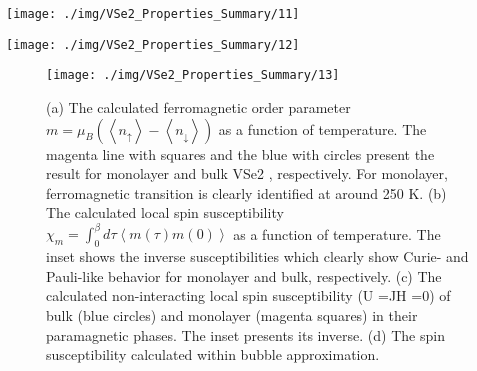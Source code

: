 \documentclass[reprint, aps, prb, showkeys]{revtex4-2}
\begin{document}
\begin{figure*}
    \texttt{[image: ./img/VSe2\_Properties\_Summary/11]}
    \caption{\label{fig:acs.jpcc.9b04281_STM} 
    Low-temperature STM images of CDW order in monolayer VSe2. On the MoS2 substrate the CDW is superimposed on the moiré structures (a, b). Different rotational domains are observed (c), and the unit cell can be identified as a √3R30 × √7R19.1 superstructure with respect to the VSe2 unit cell. The same structure can be described by two mirrored unit cells as illustrated in (e). An alternative unit cell is that described by the unit-cell diagonals of the two mirrored primitive unit cells as illustrated in (g). Often antiphase domain boundaries are observed in the CDW structure as shown in (f), giving rise to only small domains.
    }
\end{figure*}

\begin{figure*}
    \texttt{[image: ./img/VSe2\_Properties\_Summary/12]}
    \caption{\label{fig:acs.jpcc.9b04281_Phono} 
    Calculated phonon band structure of 1T monolayer structure of VSe2 (a) using spin-restricted DFT and (b) using spinpolarized DFT. The phonon soft modes with imaginary frequencies are highlighted by red color.
    }
\end{figure*}

\begin{figure}
    \texttt{[image: ./img/VSe2\_Properties\_Summary/13]}
    \caption{\label{fig:Kim_2020_OrderParameter} 
    (a) The calculated ferromagnetic order parameter $m = \mu_B(\left\langle n_{\uparrow} \right\rangle - \left\langle n_{\downarrow} \right\rangle)$ as a function of temperature. The magenta line with squares and the blue with circles present the result for monolayer and bulk VSe2 , respectively. For monolayer, ferromagnetic transition is clearly identified at around 250 K. (b) The calculated local spin susceptibility $\chi_m = \int^{\beta}_0 d \tau \left\langle m(\tau)m(0) \right\rangle $ as a function of temperature. The inset shows the inverse susceptibilities which clearly show Curie- and Pauli-like behavior for monolayer and bulk, respectively. (c) The calculated non-interacting local spin susceptibility (U =JH =0) of bulk (blue circles) and monolayer (magenta squares) in their paramagnetic phases. The inset presents its inverse. (d) The spin susceptibility calculated within bubble approximation.
    }
\end{figure}
\end{document}
